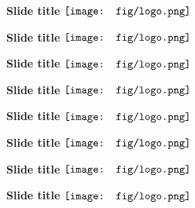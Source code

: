 \documentclass{beamer}
\begin{document}
\begin{frame}{\textbf{Slide title} \hspace{0pt plus 1 filll} $\vcenter{\hbox{\texttt{[image: fig/logo.png]}}}$}

\end{frame}

\begin{frame}{\textbf{Slide title} \hspace{0pt plus 1 filll} $\vcenter{\hbox{\texttt{[image: fig/logo.png]}}}$}

\end{frame}

\begin{frame}{\textbf{Slide title} \hspace{0pt plus 1 filll} $\vcenter{\hbox{\texttt{[image: fig/logo.png]}}}$}

\end{frame}

\begin{frame}{\textbf{Slide title} \hspace{0pt plus 1 filll} $\vcenter{\hbox{\texttt{[image: fig/logo.png]}}}$}

\end{frame}

\begin{frame}{\textbf{Slide title} \hspace{0pt plus 1 filll} $\vcenter{\hbox{\texttt{[image: fig/logo.png]}}}$}

\end{frame}

\begin{frame}{\textbf{Slide title} \hspace{0pt plus 1 filll} $\vcenter{\hbox{\texttt{[image: fig/logo.png]}}}$}

\end{frame}

\begin{frame}{\textbf{Slide title} \hspace{0pt plus 1 filll} $\vcenter{\hbox{\texttt{[image: fig/logo.png]}}}$}

\end{frame}

\begin{frame}{\textbf{Slide title} \hspace{0pt plus 1 filll} $\vcenter{\hbox{\texttt{[image: fig/logo.png]}}}$}

\end{frame}
\end{document}
